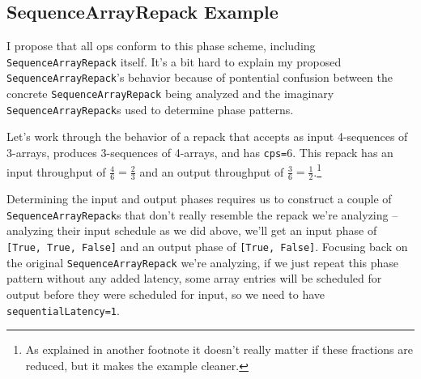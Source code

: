 \documentclass[12pt]{article}
\begin{document}
\subsection{SequenceArrayRepack Example}

I propose that all ops conform to this phase scheme, including
\texttt{SequenceArrayRepack} itself. It's a bit hard to explain my
proposed \texttt{SequenceArrayRepack}'s behavior because of pontential
confusion between the concrete \texttt{SequenceArrayRepack} being
analyzed and the imaginary \texttt{SequenceArrayRepack}s used to
determine phase patterns.

Let's work through the behavior of a repack that accepts as input
4-sequences of 3-arrays, produces 3-sequences of 4-arrays, and has
\texttt{cps=}6. This repack has an input throughput of
$\frac{4}{6} = \frac{2}{3}$
and an output throughput of $\frac{3}{6} = \frac{1}{2}$.\footnote{
As explained in another footnote it doesn't really matter if these
fractions are reduced, but it makes the example cleaner.
}

Determining the input and output phases requires us to construct a
couple of \texttt{SequenceArrayRepack}s that don't really resemble the
repack we're analyzing -- analyzing their input schedule as we did
above, we'll get an input phase of \texttt{[True, True, False]} and an
output phase of \texttt{[True, False]}. Focusing back on the original
\texttt{SequenceArrayRepack} we're analyzing, if we just repeat this
phase pattern without any added latency, some array entries will be
scheduled for output before they were scheduled for input, so we need
to have \texttt{sequentialLatency=1}.
\end{document}
